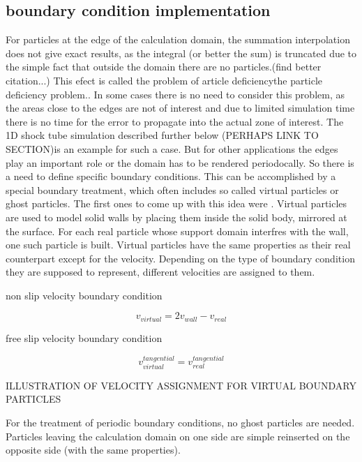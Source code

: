 \documentclass{report}
\begin{document}
\subsection{boundary condition implementation}
\label{sec:boundaryConditionImplementation}
For particles at the edge of the calculation domain, the summation interpolation does not
give exact results, as the integral (or better the sum) is truncated due to
the simple fact that outside the domain there are no
particles.\cite{Liu2003}(find better citation...) This efect is called the
problem of article deficiencythe particle deficiency
problem.\cite{Liu2003}. In some cases there is no need to consider this
problem, as the areas close to the edges are not of interest and due to
limited simulation time there is no time for the error to propagate into the
actual zone of interest. The 1D shock tube simulation described further below
(PERHAPS LINK TO SECTION)is an example for such a case.  
But for other applications the edges play an important role or the domain has
to be rendered periodocally. So there is a need to define specific boundary
conditions. This can be accomplished by a special boundary treatment, which
often includes so called virtual particles or ghost
particles\cite{Liu2003}. The first ones to come up with this idea were
\cite{LIBERSKY1993}. Virtual particles are used to model solid walls by
placing them inside the solid body, mirrored at the surface. For each real
particle whose support domain interfres with the wall, one such particle is
built. Virtual particles have the same properties as their real counterpart
except for the velocity. Depending on the type of boundary condition they are
supposed to represent, different velocities are assigned to them.\cite{Hu2006}

non slip velocity boundary condition

\begin{equation}
v_{virtual}=2v_{wall}-v_{real}
\end{equation}

free slip velocity boundary condition

\begin{equation}
v_{virtual}^{tangential}=v_{real}^{tangential}
\end{equation}

ILLUSTRATION OF VELOCITY ASSIGNMENT FOR VIRTUAL BOUNDARY PARTICLES

For the treatment of periodic boundary conditions, no ghost particles are
needed. Particles leaving the calculation domain on one side are simple
reinserted on the opposite side (with the same properties).
\end{document}
